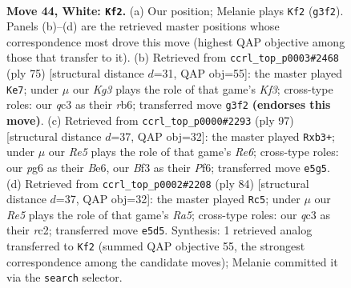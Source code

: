 \documentclass[11pt]{article}
\begin{document}
\clearpage

\begin{figure}[p]\centering
\begin{subfigure}{0.46\textwidth}\centering
\resizebox{\linewidth}{!}{%
\newchessgame
\chessboard[
  setfen={8/pp6/6pk/4R3/5P1P/b1q2BK1/8/8 w - - 0 44},
  showmover=false,
  pgfstyle=straightmove, color=movearrow, markmove={g3-f2}
]}
\caption{}
\end{subfigure}\hfill
\begin{subfigure}{0.46\textwidth}\centering
\resizebox{\linewidth}{!}{%
\newchessgame
\chessboard[
  setfen={4B3/6p1/1R2bk2/6p1/8/5P1P/5P1K/3r4 b - - 16 38},
  showmover=false,
  pgfstyle=straightmove, color=movearrow, markmove={f6-e7}
]}
\caption{}
\end{subfigure}
\\[4pt]
\begin{subfigure}{0.46\textwidth}\centering
\resizebox{\linewidth}{!}{%
\newchessgame
\chessboard[
  setfen={8/5pk1/3pbp2/7p/8/KP2r3/5QP1/8 b - - 0 49},
  showmover=false,
  pgfstyle=straightmove, color=movearrow, markmove={e3-b3}
]}
\caption{}
\end{subfigure}\hfill
\begin{subfigure}{0.46\textwidth}\centering
\resizebox{\linewidth}{!}{%
\newchessgame
\chessboard[
  setfen={4bk2/6p1/8/R5pp/8/5P1P/2r2BK1/8 w - - 2 43},
  showmover=false,
  pgfstyle=straightmove, color=movearrow, markmove={a5-c5}
]}
\caption{}
\end{subfigure}
\caption{\textbf{Move 44, White: \texttt{Kf2}.} (a) Our position; Melanie plays \texttt{Kf2} (\texttt{g3f2}). Panels (b)--(d) are the retrieved master positions whose correspondence most drove this move (highest QAP objective among those that transfer to it). (b) Retrieved from \texttt{ccrl\_top\_p0003\#2468} (ply 75) [structural distance $d$=31, QAP obj=55]: the master played \texttt{Ke7}; under $\mu$ our \emph{Kg3} plays the role of that game's \emph{Kf3}; cross-type roles: our \emph{q}c3 as their \emph{r}b6; transferred move \texttt{g3f2} \textbf{(endorses this move)}. (c) Retrieved from \texttt{ccrl\_top\_p0000\#2293} (ply 97) [structural distance $d$=37, QAP obj=32]: the master played \texttt{Rxb3+}; under $\mu$ our \emph{Re5} plays the role of that game's \emph{Re6}; cross-type roles: our \emph{p}g6 as their \emph{B}e6, our \emph{B}f3 as their \emph{P}f6; transferred move \texttt{e5g5}. (d) Retrieved from \texttt{ccrl\_top\_p0002\#2208} (ply 84) [structural distance $d$=37, QAP obj=32]: the master played \texttt{Rc5}; under $\mu$ our \emph{Re5} plays the role of that game's \emph{Ra5}; cross-type roles: our \emph{q}c3 as their \emph{r}c2; transferred move \texttt{e5d5}. Synthesis: 1 retrieved analog transferred to \texttt{Kf2} (summed QAP objective 55, the strongest correspondence among the candidate moves); Melanie committed it via the \texttt{search} selector.}
\label{fig:thought-m86}
\end{figure}
\end{document}
